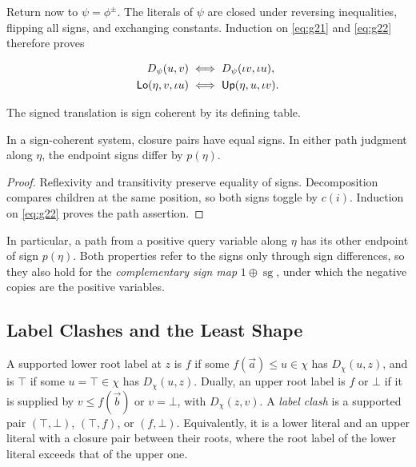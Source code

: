Return now to $\psi=\phi^{\pm}$. The literals of $\psi$ are closed under reversing
inequalities, flipping all signs, and exchanging constants. Induction on
\eqref{eq:g21} and \eqref{eq:g22} therefore proves

\begin{equation}\label{eq:g25}
\begin{aligned}
 D_\psi(u,v)&\iff D_\psi(\iota v,\iota u),\\
 \mathsf{Lo}(\eta,v,\iota u)
 &\iff\mathsf{Up}(\eta,u,\iota v).
 \end{aligned}
\end{equation}

The signed translation is sign coherent by its defining table.
\begin{lemma}\label{lem:sign-purity}
In a sign-coherent system, closure pairs have equal signs. In either
path judgment along $\eta$, the endpoint signs differ by $p(\eta)$.
\end{lemma}
\begin{proof}
Reflexivity and transitivity preserve equality of signs. Decomposition
compares children at the same position, so both signs toggle by $c(i)$.
Induction on \eqref{eq:g22} proves the path assertion.
\end{proof}
In particular, a path from a positive query variable along $\eta$ has
its other endpoint of sign $p(\eta)$. Both properties refer to the signs
only through sign differences, so they also hold for the
\emph{complementary sign map} $1\oplus\operatorname{sg}$, under which the
negative copies are the positive variables.

\subsection{Label Clashes and the Least Shape}\label{sec:least}
A supported lower root label at $z$ is $f$ if some
$f(\vec a)\le u\in\chi$ has $D_\chi(u,z)$, and is $\top$ if some
$u=\top\in\chi$ has $D_\chi(u,z)$. Dually, an upper root label is
$f$ or $\bot$ if it is supplied by $v\le f(\vec b)$ or
$v=\bot$, with $D_\chi(z,v)$. A \emph{label clash} is a supported pair
$(\top,\bot)$, $(\top,f)$, or $(f,\bot)$. Equivalently, it is a
lower literal and an upper literal with a closure pair between their roots,
where the root label of the lower literal exceeds that of the upper one.


